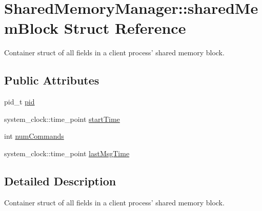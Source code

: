 \hypertarget{structSharedMemoryManager_1_1sharedMemBlock}{\section{Shared\-Memory\-Manager\-:\-:shared\-Mem\-Block Struct Reference}
\label{structSharedMemoryManager_1_1sharedMemBlock}
}


Container struct of all fields in a client process' shared memory block.  


\subsection*{Public Attributes}
\begin{DoxyCompactItemize}
\item 
pid\-\_\-t \hyperlink{structSharedMemoryManager_1_1sharedMemBlock_af10ab35d9c14b164824710adeb4bb2ef}{pid}
\item 
system\-\_\-clock\-::time\-\_\-point \hyperlink{structSharedMemoryManager_1_1sharedMemBlock_a91e99382dfd3baa0a9e9864f0c9964e1}{start\-Time}
\item 
int \hyperlink{structSharedMemoryManager_1_1sharedMemBlock_aa3562377afe5f7cb1294887bd328437f}{num\-Commands}
\item 
system\-\_\-clock\-::time\-\_\-point \hyperlink{structSharedMemoryManager_1_1sharedMemBlock_a83d99997177411ee92117b99b1924ddf}{last\-Msg\-Time}
\end{DoxyCompactItemize}


\subsection{Detailed Description}
Container struct of all fields in a client process' shared memory block. 

